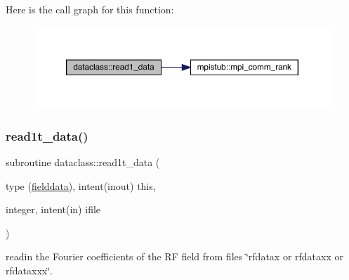 Here is the call graph for this function\+:\nopagebreak
\begin{figure}[H]
\begin{center}
\leavevmode
\includegraphics[width=350pt]{namespacedataclass_a6733af7e3067d69140c61e2b4580a70b_cgraph}
\end{center}
\end{figure}
\mbox{\label{namespacedataclass_a8a4f016b0eeea3567fb59c4100c5cdc5}} 
\subsubsection{\texorpdfstring{read1t\_data()}{read1t\_data()}}
{\footnotesize\ttfamily subroutine dataclass\+::read1t\+\_\+data (\begin{DoxyParamCaption}\item[{type (\mbox{\hyperlink{namespacedataclass_structdataclass_1_1fielddata}{fielddata}}), intent(inout)}]{this,  }\item[{integer, intent(in)}]{ifile }\end{DoxyParamCaption})}



readin the Fourier coefficients of the RF field from files \char`\"{}rfdatax or rfdataxx or rfdataxxx\char`\"{}. 

